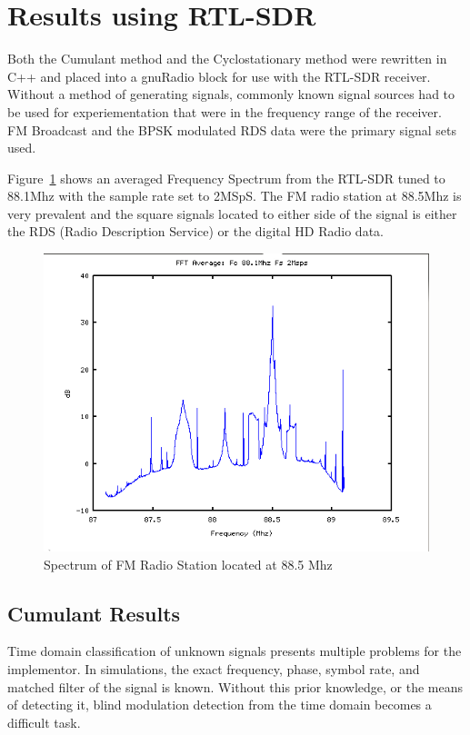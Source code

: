 \section{Results using RTL-SDR}

Both the Cumulant method and the Cyclostationary method were rewritten in C++
and placed into a gnuRadio block for use with the RTL-SDR receiver.  Without a
method of generating signals, commonly known signal sources had to be used for
experiementation that were in the frequency range of the receiver.  FM Broadcast
and the BPSK modulated RDS data were the primary signal sets used.

Figure~\ref{fig:SignalOfInterest} shows an averaged Frequency Spectrum from the
RTL-SDR tuned to 88.1Mhz with the sample rate set to 2MSpS.  The FM radio
station at 88.5Mhz is very prevalent and the square signals located to either
side of the signal is either the RDS (Radio Description Service) or the
digital HD Radio data.  

\begin{figure}
\centering
\includegraphics[width=\linewidth]{../img/Report_RTL_SDR_FFT_881M_2Msps.png}
\caption{Spectrum of FM Radio Station located at 88.5 Mhz}
\label{fig:SignalOfInterest}
\end{figure}


\subsection{Cumulant Results}

Time domain classification of unknown signals presents multiple problems
for the implementor.  In simulations, the exact frequency, phase, symbol rate,
and matched filter of the signal is known.  Without this prior knowledge, or the
means of detecting it, blind modulation detection from the time domain becomes a
difficult task.
 
